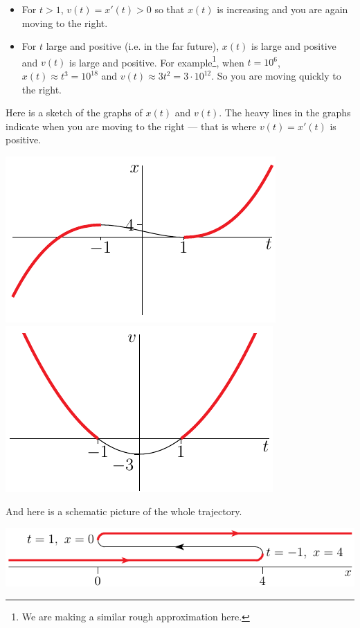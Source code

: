 \begin{eg}
\begin{itemize}
\item For $t>1$, $v(t)=x'(t)>0$ so that $x(t)$ is increasing and you are
again moving to the right.

\item For $t$ large and positive (i.e. in the far future), $x(t)$ is large
and positive and $v(t)$ is large and positive. For example\footnote{We are making a
similar rough approximation here.}, when $t=10^6$, $x(t)\approx t^3= 10^{18}$ and
$v(t)\approx  3t^2 = 3\cdot 10^{12}$. So you are moving quickly to the right.

\end{itemize}
Here is a sketch of the graphs of $x(t)$ and $v(t)$. The heavy lines in the graphs
indicate when you are moving to the right --- that is where $v(t)=x'(t)$ is positive.

\begin{efig}
\begin{center}
   \includegraphics{speedB}
   \includegraphics{speedA}
\end{center}
\end{efig}

And here is a schematic picture of the whole trajectory.

\begin{efig}
\begin{center}
   \includegraphics{speedC}
\end{center}
\end{efig}

\end{eg}

